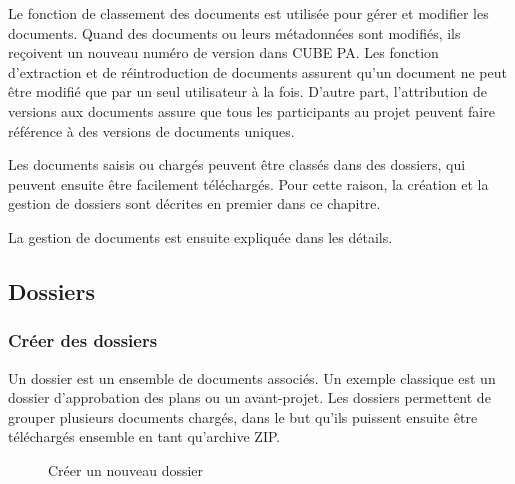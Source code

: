 \vspace{\baselineskip}

Le fonction de classement des documents est utilisée pour gérer et modifier les documents. Quand des documents ou leurs métadonnées sont modifiés, ils reçoivent un nouveau numéro de version dans CUBE PA. Les fonction d'extraction et de réintroduction de documents assurent qu'un document ne peut être modifié que par un seul utilisateur à la fois. D'autre part, l'attribution de versions aux documents assure que tous les participants au projet peuvent faire référence à des versions de documents uniques. 

\vspace{1cm}  

Les documents saisis ou chargés peuvent être classés dans des dossiers, qui peuvent ensuite être facilement téléchargés. Pour cette raison, la création et la gestion de dossiers sont décrites en premier dans ce chapitre.

\vspace{\baselineskip}

La gestion de documents est ensuite expliquée dans les détails.

\subsection{Dossiers}
\label{bkm:Ref442544219}\subsubsection{Créer des dossiers}

Un dossier est un ensemble de documents associés. Un exemple classique est un dossier d'approbation des plans ou un avant-projet. Les dossiers permettent de grouper plusieurs documents chargés, dans le but qu'ils puissent ensuite être téléchargés ensemble en tant qu'archive ZIP. 

\begin{figure}[H]
\caption{Créer un nouveau dossier}
\end{figure}

